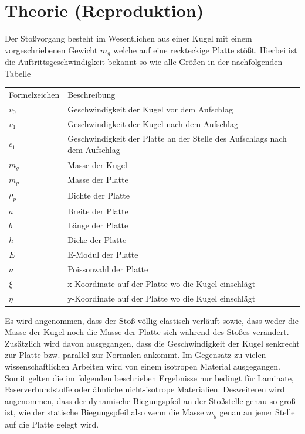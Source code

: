 \chapter{Theorie (Reproduktion)}
\label{chap:Principles}

Der Stoßvorgang besteht im Wesentlichen aus einer Kugel mit einem vorgeschriebenen Gewicht $m_g$ welche auf eine reckteckige Platte stößt. Hierbei ist die Auftrittsgeschwindigkeit bekannt so wie alle Größen in der nachfolgenden Tabelle

\begin{tabular}[h]{l | l}
	Formelzeichen & Beschreibung \\
	$v_0$ & Geschwindigkeit der Kugel vor dem Aufschlag \\
	$v_1$ & Geschwindigkeit der Kugel nach dem Aufschlag \\
	$c_1$ & Geschwindigkeit der Platte an der Stelle des Aufschlags nach dem Aufschlag \\
	$m_g$ & Masse der Kugel \\
	$m_p$ & Masse der Platte\\
	$\rho_p$ & Dichte der Platte\\
	$a$ & Breite der Platte\\
	$b$ & Länge der Platte\\
	$h$ & Dicke der Platte \\
	$E$ & E-Modul der Platte \\
	$\nu$ & Poissonzahl der Platte \\
	$\xi$ & x-Koordinate auf der Platte wo die Kugel einschlägt \\
	$\eta$ & y-Koordinate auf der Platte wo die Kugel einschlägt \\
\end{tabular}

Es wird angenommen, dass der Stoß völlig elastisch verläuft sowie, dass weder die Masse der Kugel noch die Masse der Platte sich während des Stoßes verändert.
Zusätzlich wird davon ausgegangen, dass die Geschwindigkeit der Kugel senkrecht zur Platte bzw. parallel zur Normalen ankommt. Im Gegensatz zu vielen wissenschaftlichen Arbeiten wird von einem isotropen Material ausgegangen. Somit gelten die im folgenden beschrieben Ergebnisse nur bedingt für Laminate, Faserverbundstoffe oder ähnliche nicht-isotrope Materialien. Desweiteren wird angenommen, dass der dynamische Biegungspfeil an der Stoßstelle genau so groß ist, wie der statische Biegungspfeil also wenn die Masse $m_g$ genau an jener Stelle auf die Platte gelegt wird.

